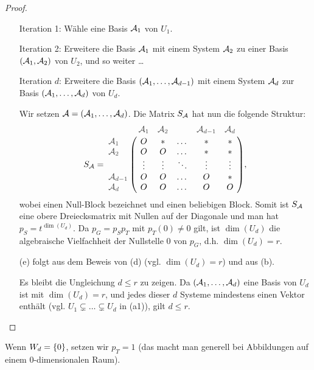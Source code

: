 \begin{proof}
\begin{itemize}
			Iteration 1: Wähle eine Basis $ \mathcal{A}_1 $ von $ U_1 $.
			
			Iteration 2: Erweitere die Basis $ \mathcal{A}_1 $ mit einem System $ \mathcal{A}_2 $ zu einer Basis $ (\mathcal{A}_1,\mathcal{A}_2) $ von $ U_2 $, und so weiter \ldots
			
			Iteration $ d $: Erweitere die Basis $ (\mathcal{A}_1, \ldots, \mathcal{A}_{d-1}) $ mit einem System $ \mathcal{A}_d $ zur Basis $ (\mathcal{A}_1, \ldots, \mathcal{A}_d) $ von $ U_d $.
			
			Wir setzen $ \mathcal{A} = (\mathcal{A}_1, \ldots, \mathcal{A}_d) $. Die Matrix $ S_{\mathcal{A}} $ hat nun die folgende Struktur:
			\begin{equation*}
				S_\A = \bordermatrix{
					& \bordernote{\A_1} & \bordernote{\A_2} & & \bordernote{\A_{d-1}} & \bordernote{\A_{d}} \cr
					\bordernote{\A_1} & O & * & \dots & * & * \cr
					\bordernote{\A_2} & O & O & \dots & * & * \cr
					& \vdots & \vdots &\ddots& \vdots & \vdots \cr
					\bordernote{\A_{d-1}} & O & O & \dots & O & * \cr
					\bordernote{\A_d} & O & O & \dots & O & O \cr
				},
			\end{equation*}
			wobei  einen Null-Block bezeichnet und \fbox{$ \ast\vphantom{O} $} einen beliebigen Block. Somit ist $ S_{\mathcal{A}} $ eine obere Dreiecksmatrix mit Nullen auf der Diagonale und man hat $ p_S = t^{\dim(U_d)} $. Da $ p_G = p_Sp_T $ mit $ p_T(0) \neq 0 $ gilt, ist $ \dim(U_d) $ die algebraische Vielfachheit der Nullstelle 0 von $ p_G $, d.h. $ \dim(U_d) = r $.
		\item[(e)]
			folgt aus dem Beweis von (d) (vgl. $ \dim(U_d) = r $) und aus (b).
			
			Es bleibt die Ungleichung $ d \leq r $ zu zeigen. Da $ (\mathcal{A}_1, \ldots, \mathcal{A}_d) $ eine Basis von $ U_d $ ist mit $ \dim(U_d) = r $, und jedes dieser $ d $ Systeme mindestens einen Vektor enthält (vgl. $ U_1 \varsubsetneq \ldots \varsubsetneq U_d $ in (a1)), gilt $ d \leq r $. \qedhere
	\end{itemize}
\end{proof}
\begin{bem}
	Wenn $ W_d = \left\{ 0 \right\} $, setzen wir $ p_T = 1 $ (das macht man generell bei Abbildungen auf einem 0-dimensionalen Raum).
\end{bem}
